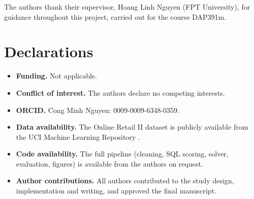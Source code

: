 \documentclass[pdflatex,sn-mathphys-num]{sn-jnl}%
\begin{document}
\backmatter

The authors thank their supervisor, Hoang Linh Nguyen (FPT University), for guidance throughout this project, carried out for the course DAP391m.

\section*{Declarations}
\begin{itemize}
\item \textbf{Funding.} Not applicable.
\item \textbf{Conflict of interest.} The authors declare no competing interests.
\item \textbf{ORCID.} Cong Minh Nguyen: 0009-0009-6348-0359.
\item \textbf{Data availability.} The Online Retail II dataset is publicly available from the UCI Machine Learning Repository \cite{onlineretail2019}.
\item \textbf{Code availability.} The full pipeline (cleaning, SQL scoring, solver, evaluation, figures) is available from the authors on request.
\item \textbf{Author contributions.} All authors contributed to the study design, implementation and writing, and approved the final manuscript.
\end{itemize}


\end{document}
